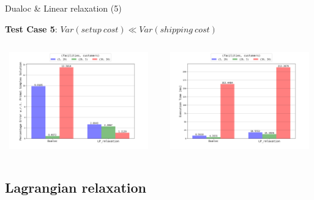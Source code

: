 \documentclass{beamer}
\begin{document}
	    \begin{frame}{Dualoc \& Linear relaxation (5)}
	    
        \textbf{Test Case 5}: $Var(setup \ cost) \ll Var(shipping \ cost)$
        
        
        \begin{columns}
	   \centering
        \includegraphics[width=6.5cm,height=4.2cm]{img/chart_error_4.png}
        
        \centering
        \includegraphics[width=6.5cm,height=4.2cm]{img/chart_time_4.png}
        \end{columns}
        
	    \end{frame}
	    
	    \subsection{Lagrangian relaxation}
	    
\end{document}
